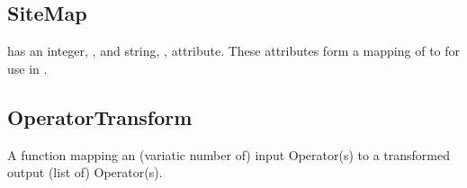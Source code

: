 

\subsection{\textbf{SiteMap}}\label{subsec:Sitemap}
 has an integer, , and string, , attribute. These attributes form a mapping of  to  for use in \Clang.

\subsection{\textbf{OperatorTransform}}\label{subsec:OperatorTransform}
 A function mapping an (variatic number of) input Operator(s) to a transformed output (list of) Operator(s). 
